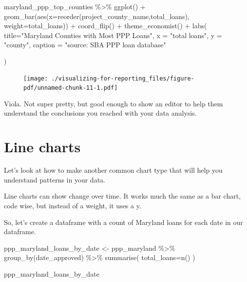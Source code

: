 \documentclass[
  letterpaper,
  DIV=11,
  numbers=noendperiod]{scrreprt}
\newenvironment{Shaded}{\begin{snugshade}}{\end{snugshade}}
\newcommand{\AttributeTok}[1]{\textcolor[rgb]{0.40,0.45,0.13}{#1}}
\newcommand{\FunctionTok}[1]{\textcolor[rgb]{0.28,0.35,0.67}{#1}}
\newcommand{\NormalTok}[1]{\textcolor[rgb]{0.00,0.23,0.31}{#1}}
\newcommand{\OtherTok}[1]{\textcolor[rgb]{0.00,0.23,0.31}{#1}}
\newcommand{\SpecialCharTok}[1]{\textcolor[rgb]{0.37,0.37,0.37}{#1}}
\newcommand{\StringTok}[1]{\textcolor[rgb]{0.13,0.47,0.30}{#1}}
\begin{document}
\begin{Shaded}
\begin{Highlighting}[]
\NormalTok{maryland\_ppp\_top\_counties }\SpecialCharTok{\%\textgreater{}\%}
  \FunctionTok{ggplot}\NormalTok{() }\SpecialCharTok{+}
  \FunctionTok{geom\_bar}\NormalTok{(}\FunctionTok{aes}\NormalTok{(}\AttributeTok{x=}\FunctionTok{reorder}\NormalTok{(project\_county\_name,total\_loans), }\AttributeTok{weight=}\NormalTok{total\_loans)) }\SpecialCharTok{+}
  \FunctionTok{coord\_flip}\NormalTok{() }\SpecialCharTok{+} 
  \FunctionTok{theme\_economist}\NormalTok{() }\SpecialCharTok{+}
  \FunctionTok{labs}\NormalTok{(}
    \AttributeTok{title=}\StringTok{"Maryland Counties with Most PPP Loans"}\NormalTok{,}
    \AttributeTok{x =} \StringTok{"total loans"}\NormalTok{,}
    \AttributeTok{y =} \StringTok{"county"}\NormalTok{,}
    \AttributeTok{caption =} \StringTok{"source: SBA PPP loan database"}
    
\NormalTok{  )}
\end{Highlighting}
\end{Shaded}

\begin{figure}[H]

{\centering \texttt{[image: ./visualizing-for-reporting\_files/figure-pdf/unnamed-chunk-11-1.pdf]}

}

\end{figure}

Viola. Not super pretty, but good enough to show an editor to help them
understand the conclusions you reached with your data analysis.

\hypertarget{line-charts}{%
\section{Line charts}\label{line-charts}}

Let's look at how to make another common chart type that will help you
understand patterns in your data.

Line charts can show change over time. It works much the same as a bar
chart, code wise, but instead of a weight, it uses a y.

So, let's create a dataframe with a count of Maryland loans for each
date in our dataframe.

\begin{Shaded}
\begin{Highlighting}[]
\NormalTok{ppp\_maryland\_loans\_by\_date }\OtherTok{\textless{}{-}}\NormalTok{ ppp\_maryland }\SpecialCharTok{\%\textgreater{}\%}
  \FunctionTok{group\_by}\NormalTok{(date\_approved) }\SpecialCharTok{\%\textgreater{}\%}
  \FunctionTok{summarise}\NormalTok{(}
    \AttributeTok{total\_loans=}\FunctionTok{n}\NormalTok{()}
\NormalTok{  )}

\NormalTok{ppp\_maryland\_loans\_by\_date }
\end{Highlighting}
\end{Shaded}
\end{document}
